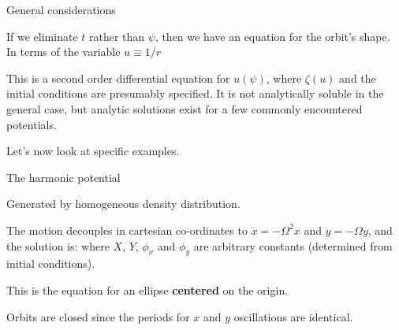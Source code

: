 \documentclass[letterpaper,landscape]{slides}
\begin{document}
\begin{slide}
\begin{center}
{\large \color{red} 
                   General considerations   }
\end{center}

If we eliminate $t$ rather than $\psi$, then we have an equation for
the orbit's shape.  In terms of the variable {\color{red} $u \equiv 1/r$}

This is a second order differential equation for $u(\psi)$, where $\zeta(u)$
and the initial conditions are presumably specified.  It is not analytically
soluble in the general case, but analytic solutions exist for a few commonly
encountered potentials.

Let's now look at specific examples.
\vfill
\end{slide}




\begin{slide}
\begin{center}
{\large \color{red} 
                         The harmonic potential    }
\end{center}

Generated by homogeneous density distribution.

The motion decouples in cartesian co-ordinates to $\ddot x = -\Omega^2 x$ 
and $\ddot y = -\Omega y$, and the solution is:
where $X$, $Y$, $\phi_x$ and $\phi_y$ are arbitrary constants (determined
from initial conditions). 

This is the equation for an ellipse {\bf centered} on the origin. 

Orbits are closed
since the periods for $x$ and $y$ oscillations are identical.



\vfill
\end{slide}
\end{document}
